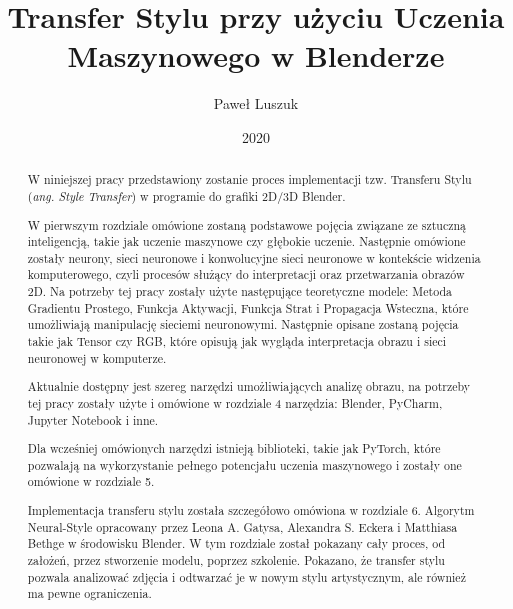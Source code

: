 \documentclass[openright]{xmgr}
\author   {Paweł Luszuk}
\title    {Transfer Stylu przy użyciu Uczenia Maszynowego w Blenderze}
\date     {2020}
\begin{document}
\begin{abstract}

\indent \indent W niniejszej pracy przedstawiony zostanie proces implementacji tzw. Transferu Stylu (\textit{ang. Style Transfer}) w programie do grafiki 2D/3D Blender.

W pierwszym rozdziale omówione zostaną podstawowe pojęcia związane ze sztuczną inteligencją,  takie jak uczenie maszynowe czy głębokie uczenie.  Następnie omówione zostały neurony,  sieci neuronowe i konwolucyjne sieci neuronowe w kontekście widzenia komputerowego,  czyli procesów służący do interpretacji oraz przetwarzania obrazów 2D.  Na potrzeby tej pracy zostały użyte następujące teoretyczne modele: Metoda Gradientu Prostego,  Funkcja Aktywacji,  Funkcja Strat i Propagacja Wsteczna,  które umożliwiają manipulację sieciemi neuronowymi.  Następnie opisane zostaną pojęcia takie jak Tensor czy RGB,  które opisują jak wygląda interpretacja obrazu i sieci neuronowej w komputerze.


Aktualnie dostępny jest szereg narzędzi umożliwiających analizę obrazu,  na potrzeby tej pracy zostały użyte i omówione w rozdziale 4 narzędzia: Blender,  PyCharm,  Jupyter Notebook i inne. 

\indent \indent Dla wcześniej omówionych narzędzi istnieją biblioteki, takie jak PyTorch,  które pozwalają na wykorzystanie pełnego potencjału uczenia maszynowego i zostały one omówione w rozdziale 5.

Implementacja transferu stylu została szczegółowo omówiona w rozdziale 6.  Algorytm Neural-Style opracowany przez Leona A. Gatysa,  Alexandra S. Eckera i Matthiasa Bethge w środowisku Blender.  W tym rozdziale został pokazany cały proces,  od założeń,  przez stworzenie modelu,  poprzez szkolenie.  Pokazano,  że transfer stylu pozwala analizować zdjęcia i odtwarzać je w nowym stylu artystycznym, ale również ma pewne ograniczenia. 
\clearpage
\end{abstract}


\maketitle
\end{document}
